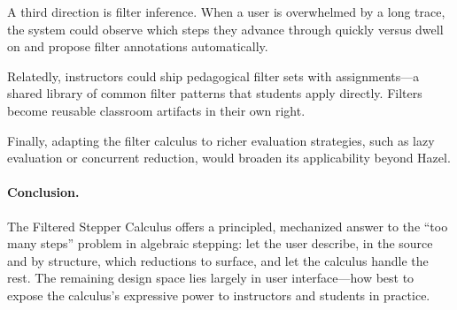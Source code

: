 A third direction is filter inference. When a user is overwhelmed by
a long trace, the system could observe which steps they advance
through quickly versus dwell on and propose filter annotations
automatically.

Relatedly, instructors could ship pedagogical filter sets with
assignments---a shared library of common filter patterns that
students apply directly. Filters become reusable classroom artifacts
in their own right.

Finally, adapting the filter calculus to richer evaluation
strategies, such as lazy evaluation or concurrent reduction, would
broaden its applicability beyond Hazel.

\paragraph*{Conclusion.}
The Filtered Stepper Calculus offers a principled, mechanized answer
to the ``too many steps'' problem in algebraic stepping: let the user
describe, in the source and by structure, which reductions to surface,
and let the calculus handle the rest. The remaining design space
lies largely in user interface---how best to expose the calculus's
expressive power to instructors and students in practice.
